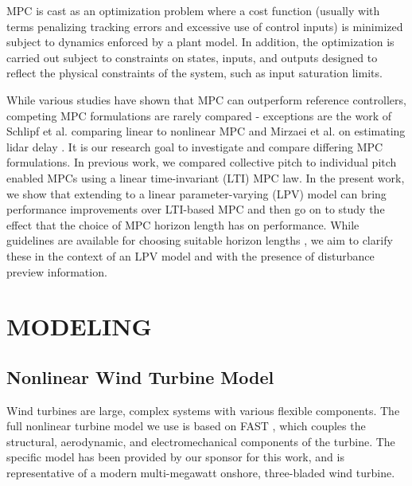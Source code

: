 \documentclass[letterpaper, 10 pt, conference]{ieeeconf}  %
\begin{document}
MPC is cast as an optimization problem where a cost function (usually with terms penalizing tracking errors and excessive use of control inputs) is minimized subject to dynamics enforced by a plant model. In addition, the optimization is carried out subject to constraints on states, inputs, and outputs designed to reflect the physical constraints of the system, such as input saturation limits.

While various studies have shown that MPC can outperform reference controllers, competing MPC formulations are rarely compared - exceptions are the work of Schlipf et al. comparing linear to nonlinear MPC \cite{Schlipf2014_2} and Mirzaei et al. on estimating lidar delay \cite{Mirzaei2013}. It is our research goal to investigate and compare differing MPC formulations. In previous work, we compared collective pitch to individual pitch enabled MPCs \cite{Sinner2018} using a linear time-invariant (LTI) MPC law. In the present work, we show that extending to a linear parameter-varying (LPV) model can bring performance improvements over LTI-based MPC and then go on to study the effect that the choice of MPC horizon length has on performance. While guidelines are available for choosing suitable horizon lengths \cite{Rossiter2018}\cite{Seborg2011}, we aim to clarify these in the context of an LPV model and with the presence of disturbance preview information.


\section{MODELING}\label{sec:Modeling}

\subsection{Nonlinear Wind Turbine Model}

Wind turbines are large, complex systems with various flexible components. The full nonlinear turbine model we use is based on FAST \cite{Jonkman2005}, which couples the structural, aerodynamic, and electromechanical components of the turbine. The specific model has been provided by our sponsor for this work, and is representative of a modern multi-megawatt onshore, three-bladed wind turbine. 
\end{document}
